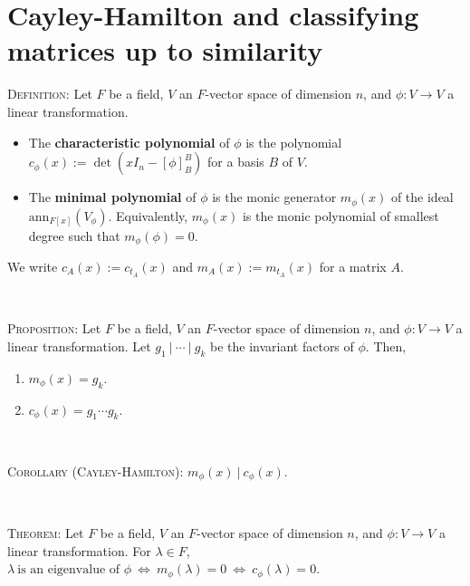 \documentclass[12pt]{amsart}
\newcommand{\showsol}[1]{\def\displaysol{#1}}
\begin{document}
\showsol{1}
	
	\thispagestyle{empty}
	
	\section*{Cayley-Hamilton and classifying matrices up to similarity}
	\begin{framed}
	\textsc{Definition:} Let $F$ be a field, $V$ an $F$-vector space of dimension $n$, and $\phi:V\to V$ a linear transformation.
	\begin{itemize}
	\item The \textbf{characteristic polynomial} of $\phi$ is the polynomial $c_\phi(x) := \det(xI_n  - [\phi]_B^B)$ for a basis $B$ of $V$.
	\item The \textbf{minimal polynomial} of $\phi$ is the monic generator $m_\phi(x)$ of the ideal $\mathrm{ann}_{F[x]}(V_\phi)$. Equivalently, $m_\phi(x)$ is the monic polynomial of smallest degree such that $m_\phi(\phi)=0$.
\end{itemize}
We write $c_A(x):=c_{t_A}(x)$ and $m_A(x):=m_{t_A}(x)$ for a matrix $A$.

\

\textsc{Proposition:} Let $F$ be a field, $V$ an $F$-vector space of dimension $n$, and $\phi:V\to V$ a linear transformation. Let $g_1 \ |\  \cdots\  |\ g_k$ be the invariant factors of $\phi$. Then,
\begin{enumerate}
\item $m_\phi(x)=g_k$.
\item $c_\phi(x)=g_1 \cdots g_k$.
\end{enumerate}

\

\textsc{Corollary (Cayley-Hamilton):} $m_\phi(x) \  | \ c_\phi(x)$.

\

\textsc{Theorem:} Let $F$ be a field, $V$ an $F$-vector space of dimension $n$, and $\phi:V\to V$ a linear transformation. For $\lambda\in F$, \  $\lambda \ \text{is an eigenvalue of $\phi$} \  \Longleftrightarrow \ m_\phi(\lambda) = 0 \  \Longleftrightarrow \ c_\phi(\lambda) = 0.$
	\end{framed}
\end{document}
